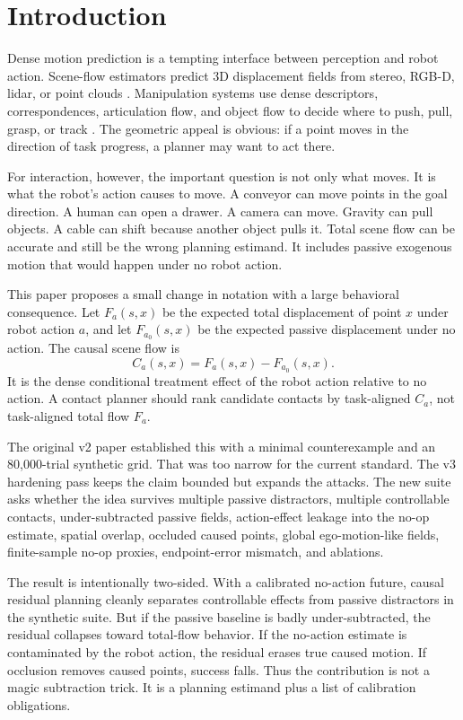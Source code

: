 \documentclass{article}
\newcommand{\noop}{a_0}
\begin{document}
\section{Introduction}

Dense motion prediction is a tempting interface between perception and robot action.
Scene-flow estimators predict 3D displacement fields from stereo, RGB-D, lidar, or point
clouds \citep{sceneflowfields,flownet3d,pointpwc,raft3d,nsfp,flowstep3d}.  Manipulation
systems use dense descriptors, correspondences, articulation flow, and object flow to
decide where to push, pull, grasp, or track \citep{denseobjectnets,transporter,flowbot3d,flowbotpp}.
The geometric appeal is obvious: if a point moves in the direction of task progress, a
planner may want to act there.

For interaction, however, the important question is not only what moves.  It is what the
robot's action causes to move.  A conveyor can move points in the goal direction.  A
human can open a drawer.  A camera can move.  Gravity can pull objects.  A cable can
shift because another object pulls it.  Total scene flow can be accurate and still be the
wrong planning estimand.  It includes passive exogenous motion that would happen under
no robot action.

This paper proposes a small change in notation with a large behavioral consequence.  Let
$F_a(s,x)$ be the expected total displacement of point $x$ under robot action $a$, and
let $F_{\noop}(s,x)$ be the expected passive displacement under no action.  The causal
scene flow is
\[
  C_a(s,x) = F_a(s,x) - F_{\noop}(s,x).
\]
It is the dense conditional treatment effect of the robot action relative to no action.
A contact planner should rank candidate contacts by task-aligned $C_a$, not task-aligned
total flow $F_a$.

The original v2 paper established this with a minimal counterexample and an 80,000-trial
synthetic grid.  That was too narrow for the current standard.  The v3 hardening pass
keeps the claim bounded but expands the attacks.  The new suite asks whether the idea
survives multiple passive distractors, multiple controllable contacts, under-subtracted
passive fields, action-effect leakage into the no-op estimate, spatial overlap, occluded
caused points, global ego-motion-like fields, finite-sample no-op proxies, endpoint-error
mismatch, and ablations.

The result is intentionally two-sided.  With a calibrated no-action future, causal
residual planning cleanly separates controllable effects from passive distractors in the
synthetic suite.  But if the passive baseline is badly under-subtracted, the residual
collapses toward total-flow behavior.  If the no-action estimate is contaminated by the
robot action, the residual erases true caused motion.  If occlusion removes caused
points, success falls.  Thus the contribution is not a magic subtraction trick.  It is a
planning estimand plus a list of calibration obligations.
\end{document}
